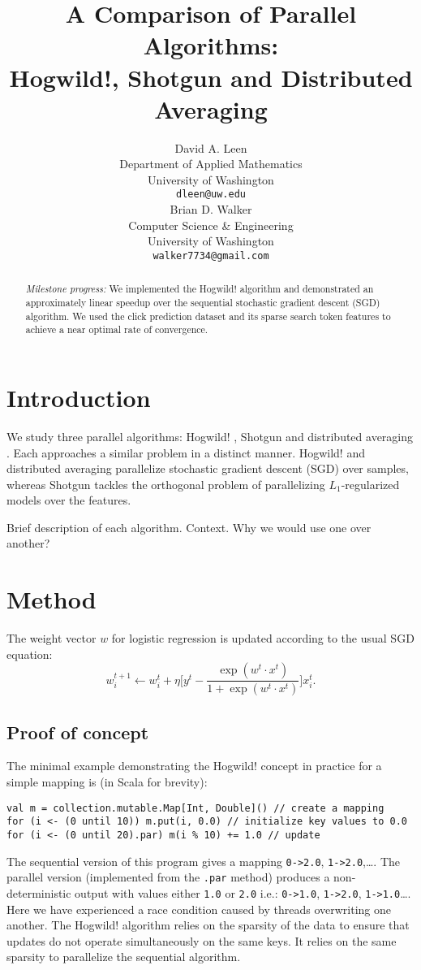 \documentclass{article} %
\title{A Comparison of Parallel Algorithms:\\ {\Large Hogwild!, Shotgun and Distributed Averaging}}
\author{
David A. Leen \\
Department of Applied Mathematics\\
University of Washington \\
\texttt{dleen@uw.edu} \\
\And
Brian D. Walker \\
Computer Science \& Engineering \\
University of Washington \\
\texttt{walker7734@gmail.com} \\
}
\begin{document}
\maketitle

\begin{abstract}
{\em Milestone progress:} We implemented the Hogwild! algorithm and demonstrated an approximately linear speedup over the
sequential stochastic gradient descent (SGD) algorithm.  We used the click prediction dataset and its sparse search token features to achieve a near optimal rate of convergence.
\end{abstract}

\section{Introduction}
We study three parallel algorithms: Hogwild! \cite{niu2011hogwild}, Shotgun \cite{bradley2011parallel} and distributed averaging \cite{zhang2012comunication}. Each approaches a similar problem in a distinct manner. Hogwild! and distributed averaging parallelize stochastic gradient descent (SGD) over samples, whereas Shotgun tackles the orthogonal problem of parallelizing $L_1$-regularized models over the features.



Brief description of each algorithm. Context. Why we would use one over another?

\section{Method}
The weight vector $w$ for logistic regression is updated according to the usual SGD equation:
\begin{equation}
w_i^{t+1} \leftarrow w_i^t + \eta \bigg[y^t - \frac{\exp{(w^t \cdot x^t)}}{1 + \exp{(w^t \cdot x^t)}} \bigg]x_i^t.
\end{equation}

 
\subsection{Proof of concept}
The minimal example demonstrating the Hogwild! concept in practice for a simple mapping is (in Scala for brevity):
\begin{lstlisting}
val m = collection.mutable.Map[Int, Double]() // create a mapping
for (i <- (0 until 10)) m.put(i, 0.0) // initialize key values to 0.0
for (i <- (0 until 20).par) m(i % 10) += 1.0 // update
\end{lstlisting}
The sequential version of this program gives a mapping \verb+0->2.0+, \verb+1->2.0+,\ldots. The parallel version (implemented from the \verb+.par+ method) produces a non-deterministic output with values either \verb+1.0+ or \verb+2.0+ i.e.: \verb+0->1.0+, \verb+1->2.0+, \verb+1->1.0+\ldots. Here we have experienced a race condition caused by threads overwriting one another. The Hogwild! algorithm relies on the sparsity of the data to ensure that updates do not operate simultaneously on the same keys. It relies on the same sparsity to parallelize the sequential algorithm.
\end{document}
